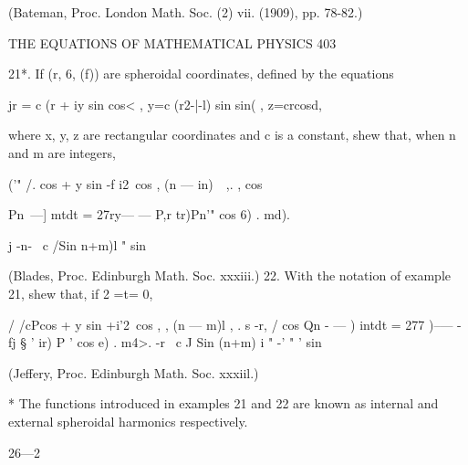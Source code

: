 (Bateman, Proc. London Math. Soc. (2) vii. (1909), pp. 78-82.) 



THE EQUATIONS OF MATHEMATICAL PHYSICS 403 

21*. If (r, 6, (f)) are spheroidal coordinates, defined by the equations 

jr = c (r  + iy sin   cos< , y=c (r2-|-l) sin  sin( , z=crcosd, 

where x, y, z are rectangular coordinates and c is a constant, shew that, when n and m are 
integers, 

('"   /.  cos  + y sin -f i2\ cos ,   (n — in)\ \   ,.     ,   cos 

Pn\  —]   mtdt = 27ry—  —  P,r tr)Pn'"  cos 6) . md). 

j -n- \ c /Sin  n+m)l     "   sin   

(Blades, Proc. Edinburgh Math. Soc. xxxiii.) 
22. With the notation of example 21, shew that, if 2 =t= 0, 

/    /cPcos  + y sin  +i'2\ cos , ,  (n — m)l  , . s -r, /   cos 
Qn  - — )   intdt = 277 )--— -fj § '   ir) P '  cos e) . m4>. 
-r \ c J Sin (n+m) i  "   -' "   ' sin   

(Jeffery, Proc. Edinburgh Math. Soc. xxxiil.) 

* The functions introduced in examples 21 and 22 are known as internal and external 
spheroidal harmonics respectively. 



26—2 

